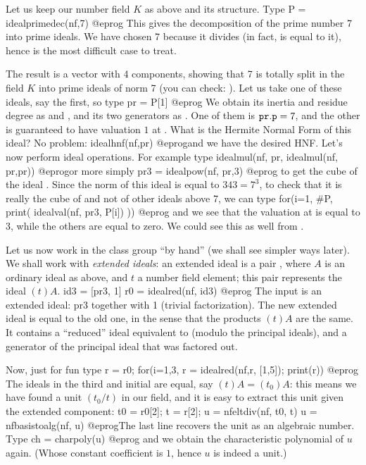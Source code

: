 Let us keep our number field $K$ as above and its  structure. Type
\bprog
  P = idealprimedec(nf,7)
@eprog\noindent
This gives the decomposition of the prime number 7 into prime ideals. We have
chosen 7 because it divides  (in fact, is equal to it), hence
is the most difficult case to treat.

The result is a vector with 4 components, showing that 7 is totally split in
the field $K$ into prime ideals of norm 7 (you can check:
). Let us take one of these ideals, say the first, so
type
\bprog
  pr = P[1]
@eprog
We obtain its inertia and residue degree as 
and , and its two generators as . One of them is
${\tt pr.p} = 7$, and the other is guaranteed to have valuation $1$ at
. What is the Hermite Normal Form of this ideal? No problem:
\bprog
  idealhnf(nf,pr)
@eprog\noindent and we have the desired HNF. Let's now perform ideal
operations. For example type
\bprog
  idealmul(nf, pr, idealmul(nf, pr,pr))
@eprog\noindent or more simply
\bprog
  pr3 = idealpow(nf, pr,3)
@eprog\noindent
to get the cube of the ideal . Since the norm of this ideal is equal
to $343=7^3$, to check that it is really the cube of  and not of
other ideals above 7, we can type
\bprog
  for(i=1, #P, print( idealval(nf, pr3, P[i]) ))
@eprog\noindent
and we see that the valuation at  is equal to 3, while the others are
equal to zero. We could see this as well from .

Let us now work in the class group ``by hand'' (we shall see simpler ways
later). We shall work with \emph{extended ideals}: an extended ideal is a pair
\kbd{[A, t]}, where $A$ is an ordinary ideal as above, and $t$ a number field
element; this pair represents the ideal $(t) A$.
\bprog
  id3 = [pr3, 1]
  r0 = idealred(nf, id3)
@eprog\noindent
The input  is an extended ideal: pr3 together with 1 (trivial
factorization). The new extended ideal  is equal to the old one,
in the sense that the products $(t)A$ are the same. It contains a ``reduced''
ideal equivalent to  (modulo the principal ideals), and a generator
of the principal ideal that was factored out.

Now, just for fun type
\bprog
  r = r0; for(i=1,3, r = idealred(nf,r, [1,5]); print(r))
@eprog\noindent
The ideals in the third  and initial  are equal, say
$(t) A = (t_0) A$: this means we
have found a unit $(t_0/t)$ in our field, and it is easy to extract this unit
given the extended component:
\bprog
  t0 = r0[2]; t = r[2];
  u = nfeltdiv(nf, t0, t)
  u = nfbasistoalg(nf, u)
@eprog\noindent The last line recovers the unit as an algebraic number.
Type
\bprog
  ch = charpoly(u)
@eprog\noindent
and we obtain the characteristic polynomial  of $u$ again. (Whose
constant coefficient is $1$, hence $u$ is indeed a unit.)

